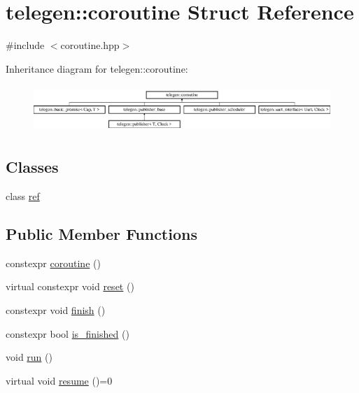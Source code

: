 \hypertarget{structtelegen_1_1coroutine}{}\section{telegen\+:\+:coroutine Struct Reference}
\label{structtelegen_1_1coroutine}


{\ttfamily \#include $<$coroutine.\+hpp$>$}

Inheritance diagram for telegen\+:\+:coroutine\+:\begin{figure}[H]
\begin{center}
\leavevmode
\includegraphics[height=1.794872cm]{structtelegen_1_1coroutine}
\end{center}
\end{figure}
\subsection*{Classes}
\begin{DoxyCompactItemize}
\item 
class \hyperlink{classtelegen_1_1coroutine_1_1ref}{ref}
\end{DoxyCompactItemize}
\subsection*{Public Member Functions}
\begin{DoxyCompactItemize}
\item 
constexpr \hyperlink{structtelegen_1_1coroutine_ac13b85fb7d6b08c684c69f1109c2f947}{coroutine} ()
\item 
virtual constexpr void \hyperlink{structtelegen_1_1coroutine_a345d1cc0fd5bd8d126022958d4f17d3b}{reset} ()
\item 
constexpr void \hyperlink{structtelegen_1_1coroutine_a335f75302785f4ee9d8073caf8cfc60b}{finish} ()
\item 
constexpr bool \hyperlink{structtelegen_1_1coroutine_a4e807c9f48ccfd7fd64a0b6ef2024da0}{is\+\_\+finished} ()
\item 
void \hyperlink{structtelegen_1_1coroutine_a48b19e2ca54c0a7b63fe5c5f19620bcb}{run} ()
\item 
virtual void \hyperlink{structtelegen_1_1coroutine_a2a7408a5b9474af3e59128934e3a5c00}{resume} ()=0
\end{DoxyCompactItemize}

